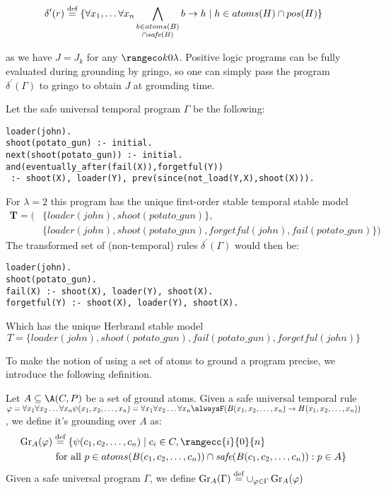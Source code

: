 \begin{equation*} \delta^{\prime}(r) \stackrel{\text{def}}{=} \{ \forall x_1, \dots \forall x_n
  \bigwedge_{\substack{b \in atoms(B)\\ \cap \textit{safe}(B)}}b
  \rightarrow h \mid h \in atoms(H) \cap pos(H)\}
\end{equation*}

as we have $J = J_k$ for any $\kinlambda$. Positive logic programs can
be fully evaluated during grounding by gringo, so one can simply pass
the program $\delta^{\prime}(\Gamma)$ to gringo to obtain $J$ at
grounding time.

\begin{example}\label{exam:shoot-nonground-safe}
  Let the safe universal temporal program $\Gamma$ be the following:
  \begin{lstlisting}[language=clingo,numbers=none]
loader(john).
shoot(potato_gun) :- initial.
next(shoot(potato_gun)) :- initial.
and(eventually_after(fail(X)),forgetful(Y)) 
 :- shoot(X), loader(Y), prev(since(not_load(Y,X),shoot(X))).
  \end{lstlisting}
  For $\lambda=2$ this program has the unique first-order stable
  temporal stable model
  \begin{align*}
  \bm{T} = (&\{ loader(john), shoot(potato\_gun) \},\\
            &\{ loader(john), shoot(potato\_gun), forgetful(john), fail(potato\_gun) \})
  \end{align*}
  The transformed set of (non-temporal) rules
  $\delta^{\prime}(\Gamma)$ would then be:
  \begin{lstlisting}[language=clingo,numbers=none]
loader(john).
shoot(potato_gun).
fail(X) :- shoot(X), loader(Y), shoot(X).
forgetful(Y) :- shoot(X), loader(Y), shoot(X).
  \end{lstlisting}
  Which has the unique Herbrand stable model
  $$
  T = \{ loader(john), shoot(potato\_gun), fail(potato\_gun), forgetful(john) \}
  $$
\end{example}

To make the notion of using a set of atoms to ground a program
precise, we introduce the following definition.

\begin{definition}
  Let $A \subseteq \A(C,P)$ be a set of ground atoms. Given a safe
  universal temporal rule
  $\varphi = \forallx \psi(x_1,x_2,\dots,x_n) = \forallx \alwaysF
  (B(x_1,x_2,\dots,x_n) \rightarrow H(x_1,x_2,\dots,x_n))$, we define
  it's grounding over $A$ as:
  \begin{align*}
    \ground{A}{\varphi}& \defeq \{ \psi(c_1,c_2,\dots,c_n) \mid c_i \in C, \rangecc{i}{0}{n}\\
    &\text{ for all } p \in atoms(B(c_1,c_2,\dots,c_n)) \cap \safe{B(c_1,c_2,\dots,c_n)}:p \in A \}
  \end{align*}
  Given a safe universal program $\Gamma$, we define
  $\operatorname{Gr}_{A}(\Gamma) \stackrel{\text{def}}{=} \cup_{\varphi \in
    \Gamma}\operatorname{Gr}_{A}(\varphi)$
\end{definition}

